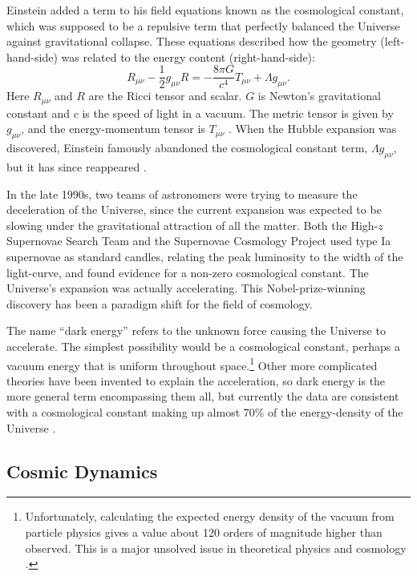 Einstein added a term to his field equations known as the cosmological constant, which was supposed to be a repulsive term that perfectly balanced the Universe against gravitational collapse. These equations described how the geometry (left-hand-side) was related to the energy content (right-hand-side):
\begin{equation}
R_{\mu\nu} - \frac{1}{2} g_{\mu\nu} R =  -\frac{8\pi G}{c^4} T_{\mu\nu} + \Lambda g_{\mu\nu}.
\label{eq:Einstein}
\end{equation}
Here $R_{\mu\nu}$ and $R$ are the Ricci tensor and scalar. $G$ is Newton's gravitational constant and $c$ is the speed of light in a vacuum. The metric tensor is given by $g_{\mu\nu}$,  and the energy-momentum tensor is $T_{\mu\nu}$ \citep{Einstein17}. When the Hubble expansion was discovered, Einstein famously abandoned the cosmological constant term, $\Lambda g_{\mu\nu}$, but it has since reappeared \citep{Weinberg13}.

In the late 1990s, two teams of astronomers were trying to measure the deceleration of the Universe, since the current expansion was expected to be slowing under the gravitational attraction of all the matter. Both the High-$z$ Supernovae Search Team \citep{Riess98} and the Supernovae Cosmology Project \citep{Perlmutter99} used type Ia supernovae as standard candles, relating the peak luminosity to the width of the light-curve, and found evidence for a non-zero cosmological constant. The Universe's expansion was actually accelerating. This Nobel-prize-winning discovery has been a paradigm shift for the field of cosmology.

The name ``dark energy'' refers to the unknown force causing the Universe to accelerate. The simplest possibility would be a cosmological constant, perhaps a vacuum energy that is uniform throughout space.\footnote{Unfortunately, calculating the expected energy density of the vacuum from particle physics gives a value about 120 orders of magnitude higher than observed. This is a major unsolved issue in theoretical physics and cosmology \citep{Weinberg13}.} Other more complicated theories have been invented to explain the acceleration, so dark energy is the more general term encompassing them all, but currently the data are consistent with a cosmological constant making up almost 70\% of the energy-density of the Universe \citep{PlanckXVI,PlanckDE15}.

\subsection{Cosmic Dynamics}
\label{sec:Dynamics}

